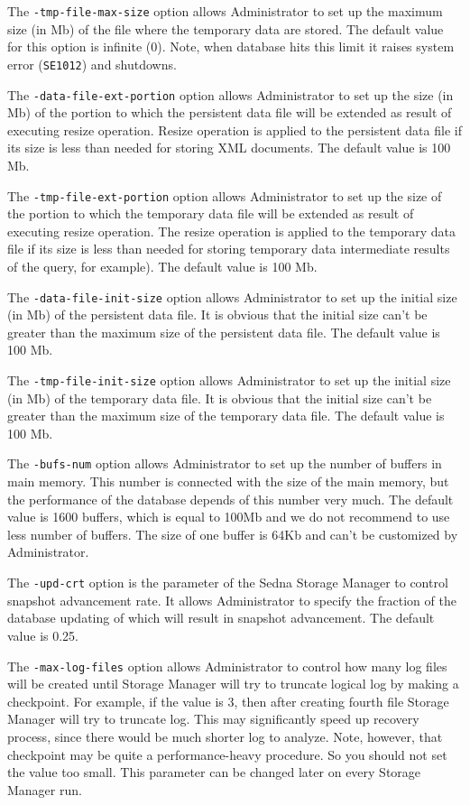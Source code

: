 \documentclass[a4paper,12pt]{article}
\begin{document}
The \verb!-tmp-file-max-size! option allows Administrator to set up the maximum
size (in Mb) of the file where the temporary data are stored. The default value
for this option is infinite (0). Note, when database hits this limit it raises
system error (\verb!SE1012!) and shutdowns.

The \verb!-data-file-ext-portion! option allows Administrator to set up the size
(in Mb) of the portion to which the persistent data file will be extended as
result of executing resize operation. Resize operation is applied to the
persistent data file if its size is less than needed for storing XML documents.
The default value is 100 Mb.

The \verb!-tmp-file-ext-portion! option allows Administrator to set up the size
of the portion to which the temporary data file will be extended as result of
executing resize operation. The resize operation is applied to the temporary
data file if its size is less than needed for storing temporary data
intermediate results of the query, for example). The default value is 100 Mb.

The \verb!-data-file-init-size! option allows Administrator to set up the
initial size (in Mb) of the persistent data file. It is obvious that the initial
size can't be greater than the maximum size of the persistent data file. The
default value is 100 Mb.

The \verb!-tmp-file-init-size! option allows Administrator to set up the initial
size (in Mb) of the temporary data file. It is obvious that the initial size
can't be greater than the maximum size of the temporary data file. The default
value is 100 Mb.

The \verb!-bufs-num! option allows Administrator to set up the number of buffers
in main memory. This number is connected with the size of the main memory, but
the performance of the database depends of this number very much. The default
value is 1600 buffers, which is equal to 100Mb and we do not recommend to use
less number of buffers. The size of one buffer is 64Kb and can't be customized
by Administrator.

The \verb!-upd-crt! option is the parameter of the Sedna Storage Manager to
control snapshot advancement rate. It allows Administrator to specify the
fraction of the database updating of which will result in snapshot advancement.
The default value is 0.25.

The \verb!-max-log-files! option allows Administrator to control how many log
files will be created until Storage Manager will try to truncate logical log by
making a checkpoint. For example, if the value is 3, then after creating
fourth file Storage Manager will try to truncate log. This may significantly
speed up recovery process, since there would be much shorter log to analyze.
Note, however, that checkpoint may be quite a performance-heavy procedure. So
you should not set the value too small. This parameter can be changed later on
every Storage Manager run.
\end{document}

